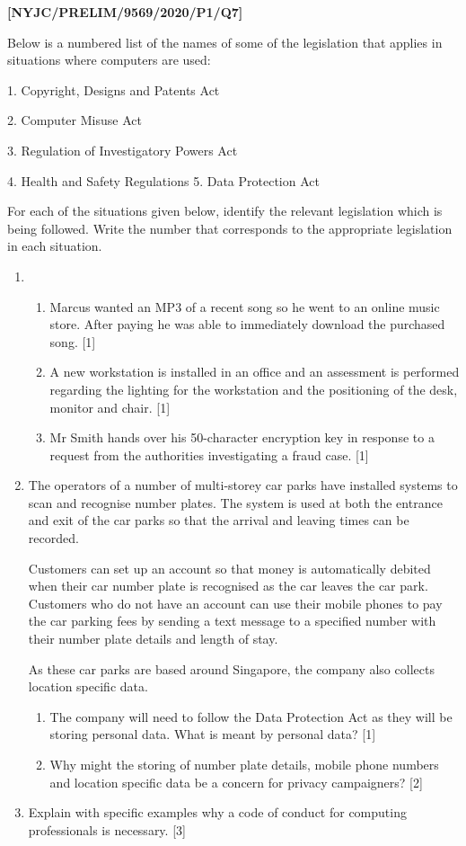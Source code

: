 \item \textbf{{[}NYJC/PRELIM/9569/2020/P1/Q7{]} }

Below is a numbered list of the names of some of the legislation that
applies in situations where computers are used:

1. Copyright, Designs and Patents Act 

2. Computer Misuse Act 

3. Regulation of Investigatory Powers Act 

4. Health and Safety Regulations 5. Data Protection Act

For each of the situations given below, identify the relevant legislation
which is being followed. Write the number that corresponds to the
appropriate legislation in each situation.
\begin{enumerate}
\item {}
\begin{enumerate}
\item Marcus wanted an MP3 of a recent song so he went to an online music
store. After paying he was able to immediately download the purchased
song. \hfill{}{[}1{]}
\item A new workstation is installed in an office and an assessment is performed
regarding the lighting for the workstation and the positioning of
the desk, monitor and chair. \hfill{}{[}1{]}
\item Mr Smith hands over his 50-character encryption key in response to
a request from the authorities investigating a fraud case. \hfill{}{[}1{]}
\end{enumerate}
\item The operators of a number of multi-storey car parks have installed
systems to scan and recognise number plates. The system is used at
both the entrance and exit of the car parks so that the arrival and
leaving times can be recorded.

Customers can set up an account so that money is automatically debited
when their car number plate is recognised as the car leaves the car
park. Customers who do not have an account can use their mobile phones
to pay the car parking fees by sending a text message to a specified
number with their number plate details and length of stay.

As these car parks are based around Singapore, the company also collects
location specific data. 
\begin{enumerate}
\item The company will need to follow the Data Protection Act as they will
be storing personal data. What is meant by personal data? \hfill{}{[}1{]}
\item Why might the storing of number plate details, mobile phone numbers
and location specific data be a concern for privacy campaigners? \hfill{}
{[}2{]}
\end{enumerate}
\item Explain with specific examples why a code of conduct for computing
professionals is necessary. \hfill{} {[}3{]}
\end{enumerate}